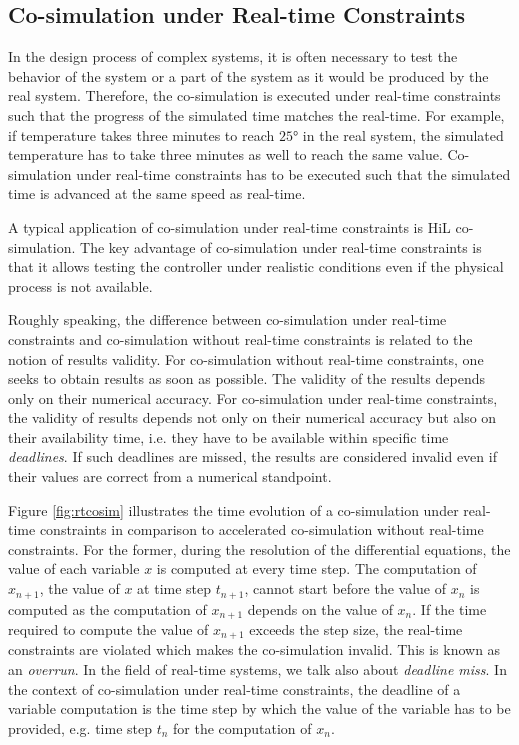 \subsection{Co-simulation under Real-time Constraints}

In the design process of complex systems, it is often necessary to test the behavior of the system or a part of the system as it would be produced by the real system. Therefore, the co-simulation is executed under real-time constraints such that the progress of the simulated time matches the real-time. For example, if temperature takes three minutes to reach $25$° in the real system, the simulated temperature has to take three minutes as well to reach the same value. Co-simulation under real-time constraints has to be executed such that the simulated time is advanced at the same speed as real-time.

A typical application of co-simulation under real-time constraints is HiL co-simulation. The key advantage of co-simulation under real-time constraints is that it allows testing the controller under realistic conditions even if the physical process is not available.

Roughly speaking, the difference between co-simulation under real-time constraints and co-simulation without real-time constraints is related to the notion of results validity. For co-simulation without real-time constraints, one seeks to obtain results as soon as possible. The validity of the results depends only on their numerical accuracy. For co-simulation under real-time constraints, the validity of results depends not only on their numerical accuracy but also on their availability time, i.e. they have to be available within specific time \textit{deadlines}. If such deadlines are missed, the results are considered invalid even if their values are correct from a numerical standpoint.

Figure \ref{fig:rtcosim} illustrates the time evolution of a co-simulation under real-time constraints in comparison to accelerated co-simulation without real-time constraints. For the former, during the resolution of the differential equations, the value of each variable $x$ is computed at every time step. The computation of $x_{n+1}$, the value of $x$ at time step $t_{n+1}$, cannot start before the value of $x_n$ is computed as the computation of $x_{n+1}$ depends on the value of $x_n$. If the time required to compute the value of $x_{n+1}$ exceeds the step size, the real-time constraints are violated which makes the co-simulation invalid. This is known as an \textit{overrun}. In the field of real-time systems, we talk also about \textit{deadline miss}. In the context of co-simulation under real-time constraints, the deadline of a variable computation is the time step by which the value of the variable has to be provided, e.g. time step $t_n$ for the computation of $x_n$.

